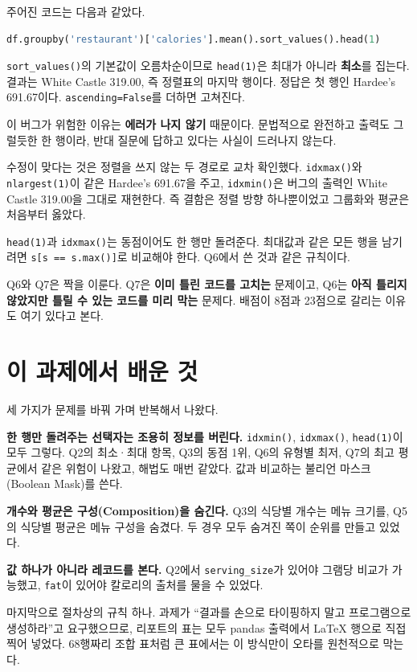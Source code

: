 주어진 코드는 다음과 같았다.

\begin{lstlisting}[language=Python]
df.groupby('restaurant')['calories'].mean().sort_values().head(1)
\end{lstlisting}

\texttt{sort\_values()}의 기본값이 오름차순이므로 \texttt{head(1)}은 최대가 아니라
\textbf{최소}를 집는다. 결과는 White Castle 319.00, 즉 정렬표의 마지막 행이다. 정답은
첫 행인 Hardee's 691.67이다. \texttt{ascending=False}를 더하면 고쳐진다.

이 버그가 위험한 이유는 \textbf{에러가 나지 않기} 때문이다. 문법적으로 완전하고 출력도
그럴듯한 한 행이라, 반대 질문에 답하고 있다는 사실이 드러나지 않는다.

수정이 맞다는 것은 정렬을 쓰지 않는 두 경로로 교차 확인했다. \texttt{idxmax()}와
\texttt{nlargest(1)}이 같은 Hardee's 691.67을 주고, \texttt{idxmin()}은 버그의 출력인
White Castle 319.00을 그대로 재현한다. 즉 결함은 정렬 방향 하나뿐이었고 그룹화와 평균은
처음부터 옳았다.

\begin{pitfall}[고친 뒤에도 남는 문제]
\texttt{head(1)}과 \texttt{idxmax()}는 동점이어도 한 행만 돌려준다. 최대값과 같은 모든
행을 남기려면 \texttt{s[s == s.max()]}로 비교해야 한다. Q6에서 쓴 것과 같은 규칙이다.
\end{pitfall}

Q6와 Q7은 짝을 이룬다. Q7은 \textbf{이미 틀린 코드를 고치는} 문제이고, Q6는 \textbf{아직
틀리지 않았지만 틀릴 수 있는 코드를 미리 막는} 문제다. 배점이 8점과 23점으로 갈리는
이유도 여기 있다고 본다.

\section{이 과제에서 배운 것}
\label{sec:hw1-learned}

세 가지가 문제를 바꿔 가며 반복해서 나왔다.

\textbf{한 행만 돌려주는 선택자는 조용히 정보를 버린다.} \texttt{idxmin()},
\texttt{idxmax()}, \texttt{head(1)}이 모두 그렇다. Q2의 최소·최대 항목, Q3의 동점 1위,
Q6의 유형별 최저, Q7의 최고 평균에서 같은 위험이 나왔고, 해법도 매번 같았다. 값과
비교하는 불리언 마스크(Boolean Mask)를 쓴다.

\textbf{개수와 평균은 구성(Composition)을 숨긴다.} Q3의 식당별 개수는 메뉴 크기를,
Q5의 식당별 평균은 메뉴 구성을 숨겼다. 두 경우 모두 숨겨진 쪽이 순위를 만들고 있었다.

\textbf{값 하나가 아니라 레코드를 본다.} Q2에서 \texttt{serving\_size}가 있어야 그램당
비교가 가능했고, \texttt{fat}이 있어야 칼로리의 출처를 물을 수 있었다.

마지막으로 절차상의 규칙 하나. 과제가 ``결과를 손으로 타이핑하지 말고 프로그램으로
생성하라''고 요구했으므로, 리포트의 표는 모두 pandas 출력에서 LaTeX 행으로 직접 찍어
넣었다. 68행짜리 조합 표처럼 큰 표에서는 이 방식만이 오타를 원천적으로 막는다.
